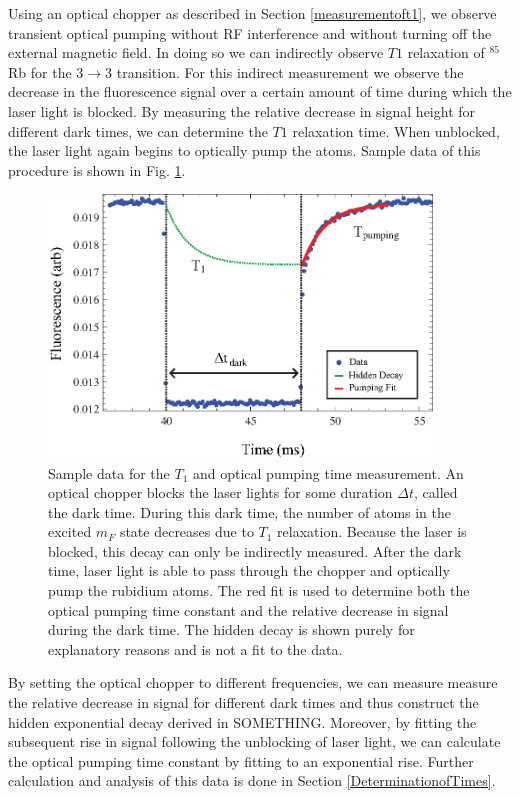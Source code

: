 Using an optical chopper as described in Section \ref{measurementoft1}, we observe transient optical pumping without RF interference and without turning off the external magnetic field.  In doing so we can indirectly observe $T1$ relaxation of $^{85}$Rb for the $3 \rightarrow 3$ transition.  For this indirect measurement we observe the decrease in the fluorescence signal over a certain amount of time during which the laser light is blocked.  By measuring the relative decrease in signal height for different dark times, we can determine the $T1$ relaxation time. When unblocked, the laser light again begins to optically pump the atoms.  Sample data of this procedure is shown in Fig. \ref{fig:chop}.
\begin{figure}[htbp]
\begin{center}
\includegraphics[height=70mm]{./figures/raw_chop.eps}
\caption{\small{Sample data for the $T_1$ and optical pumping time measurement.  An optical chopper blocks the laser lights for some duration $\Delta t$, called the dark time.  During this dark time, the number of atoms in the excited $m_F$ state decreases due to $T_1$ relaxation.  Because the laser is blocked, this decay can only be indirectly measured.  After the dark time, laser light is able to pass through the chopper and optically pump the rubidium atoms.  The red fit is used to determine both the optical pumping time constant and the relative decrease in signal during the dark time. The hidden decay is shown purely for explanatory reasons and is not a fit to the data.}}
\label{fig:chop}
\end{center}
\end{figure}
By setting the optical chopper to different frequencies, we can measure measure the relative decrease in signal for different dark times and thus construct the hidden exponential decay derived in SOMETHING.  Moreover, by fitting the subsequent rise in signal following the unblocking of laser light, we can calculate the optical pumping time constant by fitting to an exponential rise.  Further calculation and analysis of this data is done in Section \ref{DeterminationofTimes}.

